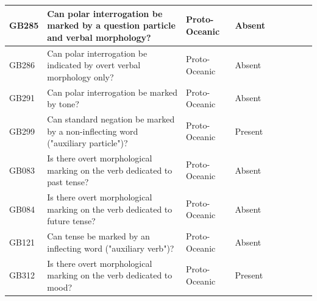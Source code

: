 \documentclass[a4paper,10pt]{article} %
\begin{document}
\begin{landscape}
\begin{longtable}{| p{2cm}| p{3cm}| p{2.5cm}|p{2cm}|p{2cm}|p{2cm}|p{2cm}|p{2cm}|p{2cm}|}
GB285&Can polar interrogation be marked by a question particle and verbal morphology?&Proto-Oceanic&Absent&\citet[89]{lynchrosscrowley_proto_grammar_oceanic}& \cellcolor{hedvig_lightgreen!50}{True Negative} & \cellcolor{hedvig_yellow!50}{Half} & \cellcolor{hedvig_yellow!50}{True Negative} & \cellcolor{hedvig_yellow!50}{Half} \\ \hline
GB286&Can polar interrogation be indicated by overt verbal morphology only?&Proto-Oceanic&Absent&\citet[89]{lynchrosscrowley_proto_grammar_oceanic}& \cellcolor{hedvig_lightgreen!50}{True Negative} & \cellcolor{hedvig_yellow!50}{Half} & \cellcolor{hedvig_yellow!50}{True Negative} & \cellcolor{hedvig_yellow!50}{Half} \\ \hline
GB291&Can polar interrogation be marked by tone?&Proto-Oceanic&Absent&\citet[89]{lynchrosscrowley_proto_grammar_oceanic}& \cellcolor{hedvig_lightgreen!50}{True Negative} & \cellcolor{hedvig_yellow!50}{Half} & \cellcolor{hedvig_yellow!50}{True Negative} & \cellcolor{hedvig_yellow!50}{Half} \\ \hline
GB299&Can standard negation be marked by a non-inflecting word ("auxiliary particle")?&Proto-Oceanic&Present&\citet[88]{lynchrosscrowley_proto_grammar_oceanic}& \cellcolor{hedvig_lightgreen!50}{True Positive} & \cellcolor{hedvig_yellow!50}{Half} & \cellcolor{hedvig_lightgreen!50}{True Positive} & \cellcolor{hedvig_yellow!50}{Half} \\ \hline
GB083&Is there overt morphological marking on the verb dedicated to past tense?&Proto-Oceanic&Absent&\citet[84]{lynchrosscrowley_proto_grammar_oceanic}& \cellcolor{hedvig_lightgreen!50}{True Negative} & \cellcolor{hedvig_yellow!50}{Half} & \cellcolor{hedvig_yellow!50}{True Negative} & \cellcolor{hedvig_yellow!50}{Half} \\ \hline
GB084&Is there overt morphological marking on the verb dedicated to future tense?&Proto-Oceanic&Absent&\citet[84]{lynchrosscrowley_proto_grammar_oceanic}& \cellcolor{hedvig_lightgreen!50}{True Negative} & \cellcolor{hedvig_yellow!50}{Half} & \cellcolor{hedvig_yellow!50}{True Negative} & \cellcolor{hedvig_yellow!50}{Half} \\ \hline
GB121&Can tense be marked by an inflecting word ("auxiliary verb")?&Proto-Oceanic&Absent&\citet[84]{lynchrosscrowley_proto_grammar_oceanic}& \cellcolor{hedvig_lightgreen!50}{True Negative} & \cellcolor{hedvig_yellow!50}{Half} & \cellcolor{hedvig_yellow!50}{True Negative} & \cellcolor{hedvig_yellow!50}{Half} \\ \hline
GB312&Is there overt morphological marking on the verb dedicated to mood?&Proto-Oceanic&Present&\citet[84]{lynchrosscrowley_proto_grammar_oceanic}& \cellcolor{hedvig_red!50}{False Negative} & \cellcolor{hedvig_yellow!50}{Half} & \cellcolor{hedvig_lightgreen!50}{True Positive} & \cellcolor{hedvig_lightgreen!50}{True Positive} \\ \hline

\end{longtable}
\end{landscape}
\end{document}
